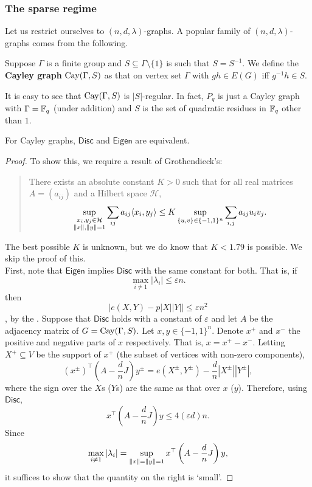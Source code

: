 		\subsubsection{The sparse regime}

			Let us restrict ourselves to $(n,d,\lambda)$-graphs. A popular family of $(n,d,\lambda)$-graphs comes from the following.

			\begin{fdef}
				Suppose $\Gamma$ is a finite group and $S\subseteq\Gamma\setminus\{1\}$ is such that $S = S^{-1}$. We define the \textbf{Cayley graph} $\operatorname{Cay}(\Gamma,S)$ as that on vertex set $\Gamma$ with $gh \in E(G)$ iff $g^{-1} h \in S$.
			\end{fdef}

			It is easy to see that $\operatorname{Cay}(\Gamma,S)$ is $|S|$-regular. In fact, $P_q$ is just a Cayley graph with $\Gamma = \mathbb{F}_q$ (under addition) and $S$ is the set of quadratic residues in $\mathbb{F}_q$ other than $1$.

			\begin{ftheo}
				For Cayley graphs, $\mathsf{Disc}$ and $\mathsf{Eigen}$ are equivalent.
			\end{ftheo}
			\begin{proof}
				To show this, we require a result of Grothendieck's:
				\begin{quote}
					There exists an absolute constant $K > 0$ such that for all real matrices $A = (a_{ij})$ and a Hilbert space $\mathcal{H}$,
					\[ \sup_{\substack{x_i,y_j \in \mathcal{H} \\ \left\lVert x\right\rVert,\left\lVert y\right\rVert = 1}} \sum_{ij} a_{ij} \langle x_i , y_j \rangle \le K \sup_{\{u,v\}\in\{-1,1\}^n} \sum_{i,j} a_{ij} u_i v_j. \]
				\end{quote}
				The best possible $K$ is unknown, but we do know that $K < 1.79$ is possible. We skip the proof of this.\\

				First, note that $\mathsf{Eigen}$ implies $\mathsf{Disc}$ with the same constant for both. That is, if
				\[  \max_{i\ne 1} |\lambda_i| \le \varepsilon n.  \]
				then
				\[ \left| e(X,Y) - p|X||Y| \right| \le \varepsilon n^2 \],
				by the .
				Suppose that $\mathsf{Disc}$ holds with a constant of $\varepsilon$ and let $A$ be the adjacency matrix of $G = \operatorname{Cay}(\Gamma,S)$. Let $x,y\in\{-1,1\}^n$. Denote $x^+$ and $x^-$ the positive and negative parts of $x$ respectively. That is, $x = x^+ - x^-$. Letting $X^+ \subseteq V$ be the support of $x^+$ (the subset of vertices with non-zero components),
				\[ (x^\pm)^\top \left( A - \frac{d}{n} J \right) y^\pm = e(X^\pm,Y^\pm) - \frac{d}{n} |X^\pm| |Y^\pm|, \]
				where the sign over the $X$s ($Y$s) are the same as that over $x$ ($y$). Therefore, using $\mathsf{Disc}$,
				\[ x^\top \left( A - \frac{d}{n}J \right)y \le 4(\varepsilon d)n. \]
				Since
				\[ \max_{i \ne 1} |\lambda_i| = \sup_{\left\lVert x\right\rVert = \left\lVert y\right\rVert = 1} x^\top \left(A - \frac{d}{n}J\right) y, \]
				it suffices to show that the quantity on the right is `small'.
			\end{proof}